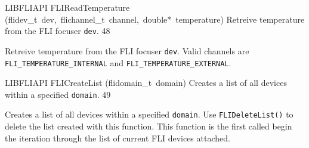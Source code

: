 \documentclass{article}
\begin{document}
\begin{cxxfunction}
{LIBFLIAPI}
        {FLIReadTemperature}
        {(flidev\_t\ dev,\ flichannel\_t\ channel,\ double*\ temperature)}
        {
 Retreive temperature from the FLI focuser \texttt{dev}.}
        {48}
\begin{cxxdoc}

Retreive temperature from the FLI focuser \texttt{dev}. Valid channels are
\texttt{FLI\_TEMPERATURE\_INTERNAL} and \texttt{FLI\_TEMPERATURE\_EXTERNAL}.


\end{cxxdoc}
\end{cxxfunction}
\begin{cxxfunction}
{LIBFLIAPI}
        {FLICreateList}
        {(flidomain\_t\ domain)}
        {
 Creates a list of all devices within a specified
 \texttt{domain}.}
        {49}
\begin{cxxdoc}

Creates a list of all devices within a specified
\texttt{domain}. Use \texttt{FLIDeleteList()} to delete the list
created with this function. This function is the first called begin
the iteration through the list of current FLI devices attached.


\end{cxxdoc}
\end{cxxfunction}
\end{document}
